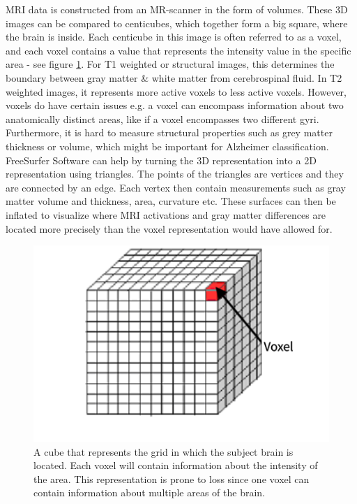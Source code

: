 \documentclass[12pt, fleqn, titlepage]{article}
\newcommand{\1}[1]{\mathds{1}\left[#1\right]}
\begin{document}
MRI data is constructed from an MR-scanner in the form of volumes. These 3D images can be compared to centicubes, which together form a big square, where the brain is inside. Each centicube in this image is often referred to as a voxel, and each voxel contains a value that represents the intensity value in the specific area - see figure \ref{fig:voxel}. For T1 weighted or structural images, this determines the boundary between gray matter \& white matter from cerebrospinal fluid. In T2 weighted images, it represents more active voxels to  less active voxels. However, voxels do have certain issues e.g. a voxel can encompass information about two anatomically distinct areas, like if a voxel encompasses two different gyri. Furthermore, it is hard to measure structural properties such as grey matter thickness or volume, which might be important for Alzheimer classification. FreeSurfer Software can help by turning the 3D representation into a 2D representation using triangles. The points of the triangles are vertices and they are connected by an edge. Each vertex then contain measurements such as gray matter volume and thickness, area, curvature etc. These surfaces can then be inflated to visualize where MRI activations and gray matter differences are located more precisely than the voxel representation would have allowed for. 

\begin{figure}[H]
	\centering
	\includegraphics[width=0.5\linewidth]{imgs/voxel}
	\caption{A cube that represents the grid in which the subject brain is located. Each voxel will contain information about the intensity of the area. This representation is prone to loss since one voxel can contain information about multiple areas of the brain.}
	\label{fig:voxel}
\end{figure}
\end{document}
